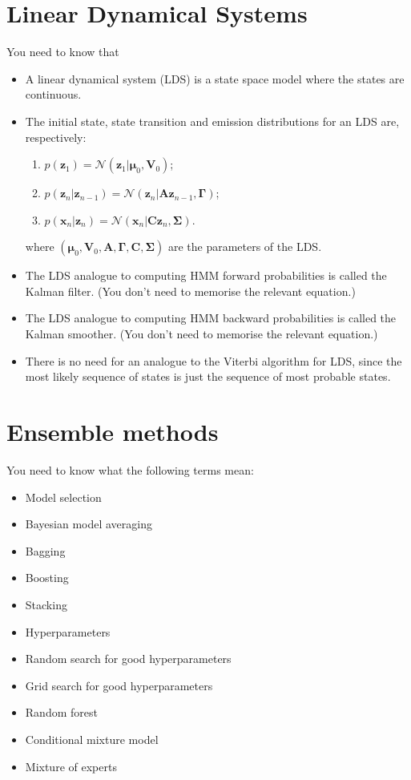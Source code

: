 \documentclass{article}
\newcommand{\bs}{\boldsymbol}
\newcommand{\yntk}{You need to know}
\begin{document}
\section{Linear Dynamical Systems}
\label{sec:lds}

\yntk{} that
\begin{itemize}
\item A linear dynamical system (LDS) is a state space model where the states
  are continuous.
\item The initial state, state transition and emission distributions
  for an LDS are, respectively:
  \begin{enumerate}
  \item $p(\bs z_1) = \mathcal{N}(\bs z_1 | \bs\mu_0, \bs V_0)$;
  \item $p(\bs z_n | \bs z_{n-1}) = \mathcal{N}(\bs z_n | \bs A \bs z_{n-1}, \bs\Gamma)$;
  \item $p(\bs x_n | \bs z_n) = \mathcal{N}(\bs x_n | \bs C \bs z_n, \bs\Sigma)$.
  \end{enumerate}
  where $(\bs\mu_0, \bs V_0, \bs A, \bs \Gamma, \bs C, \bs \Sigma)$ are
  the parameters of the LDS.
\item The LDS analogue to computing HMM forward probabilities is
  called the Kalman filter. (You don't need to memorise the relevant equation.)
\item The LDS analogue to computing HMM backward probabilities is
  called the Kalman smoother. (You don't need to memorise the relevant
  equation.)
\item There is no need for an analogue to the Viterbi algorithm for
  LDS, since the most likely sequence of states is just the sequence
  of most probable states.
\end{itemize}

\section{Ensemble methods}
\label{sec:ensembles}

\yntk{} what the following terms mean:
\begin{itemize}
\item Model selection
\item Bayesian model averaging
\item Bagging
\item Boosting
\item Stacking
\item Hyperparameters
\item Random search for good hyperparameters
\item Grid search for good hyperparameters
\item Random forest
\item Conditional mixture model
\item Mixture of experts
\end{itemize}
\end{document}
